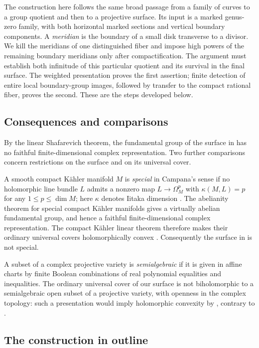 The construction here follows the same broad passage from a family
of curves to a group quotient and then to a projective surface.
Its input is a marked genus-zero family, with both horizontal marked
sections and vertical boundary components. A \emph{meridian} is the
boundary of a small disk transverse to a divisor. We kill the meridians of
one distinguished fiber and impose high powers of the remaining
boundary meridians only after compactification. The argument must
establish both infinitude of this particular quotient and its
survival in the final surface. The weighted presentation proves the
first assertion; finite detection of entire local boundary-group
images, followed by transfer to the compact rational fiber, proves
the second. These are the steps developed below.

\subsection{Consequences and comparisons}

By the linear Shafarevich theorem, the fundamental group of the surface
in  has no faithful finite-dimensional complex
representation. Two further comparisons concern restrictions on the
surface and on its universal cover.

A smooth compact K\"ahler manifold $M$ is \emph{special} in Campana's
sense if no holomorphic line bundle $L$ admits a nonzero map
$L\to\Omega_M^p$ with $\kappa(M,L)=p$ for any $1\le p\le\dim M$;
here $\kappa$ denotes Iitaka dimension
\citep[Theorem~2.27]{Campana2004}. The abelianity theorem for
special compact K\"ahler manifolds gives a virtually abelian
fundamental group, and hence a faithful finite-dimensional complex
representation. The compact K\"ahler linear theorem therefore makes
their ordinary universal covers holomorphically convex
\citep[Corollary~1.4]{OpenAIAbelianity2026}.
Consequently the surface in  is not special.

A subset of a complex projective variety is \emph{semialgebraic}
if it is given in affine charts by finite Boolean combinations of
real polynomial equalities and inequalities. The ordinary universal
cover of our surface is not biholomorphic to a semialgebraic open
subset of a projective variety, with openness in the complex
topology: such a presentation would imply holomorphic convexity by
\citep[Corollary~8.1]{OpenAISemialgebraicCovers2026}, contrary to
.

\subsection{The construction in outline}

